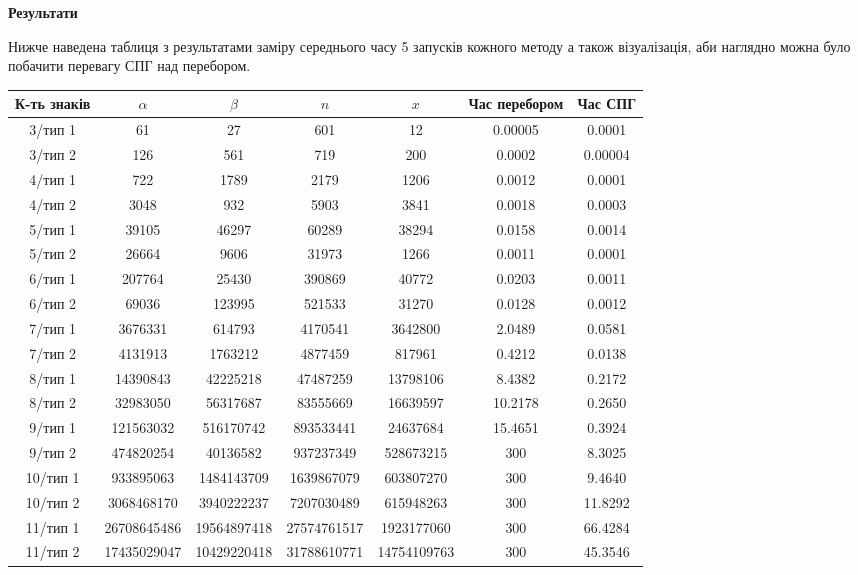 \documentclass[fontsize=14.4pt]{report}
\begin{document}
\noindent\large\textbf{Результати}\par
Нижче наведена таблиця з результатами заміру середнього часу 5 запусків кожного методу а також візуалізація, аби наглядно можна було побачити перевагу СПГ над перебором.
\begin{table}[h!]
\small
\centering
\begin{tabular}{|c|c|c|c|c|c|c|}
\hline
К-ть знаків & $\alpha$ & $\beta$ & $n$ & $x$ & Час перебором &  Час СПГ \\
\hline
3/тип 1 & 61 & 27 & 601 & 12 & 0.00005 & 0.0001 \\
\hline
3/тип 2 & 126 & 561 & 719 & 200 & 0.0002 & 0.00004 \\
\hline
4/тип 1 & 722 & 1789 & 2179 & 1206 & 0.0012 & 0.0001 \\
\hline
4/тип 2 & 3048 & 932 & 5903 & 3841 & 0.0018 & 0.0003 \\
\hline
5/тип 1 & 39105 & 46297 & 60289 & 38294 & 0.0158 & 0.0014 \\
\hline
5/тип 2 & 26664 & 9606 & 31973 & 1266 & 0.0011 & 0.0001 \\
\hline
6/тип 1 & 207764 & 25430 & 390869 & 40772 & 0.0203 & 0.0011 \\
\hline
6/тип 2 & 69036 & 123995 & 521533 & 31270 & 0.0128 & 0.0012 \\
\hline
7/тип 1 & 3676331 & 614793 & 4170541 & 3642800 & 2.0489 & 0.0581 \\
\hline
7/тип 2 & 4131913 & 1763212 & 4877459 & 817961 & 0.4212 & 0.0138 \\
\hline
8/тип 1 & 14390843 & 42225218 & 47487259 & 13798106 & 8.4382 & 0.2172 \\
\hline
8/тип 2 & 32983050 & 56317687 & 83555669 & 16639597 & 10.2178 & 0.2650 \\
\hline
9/тип 1 & 121563032 & 516170742 & 893533441 & 24637684 & 15.4651 & 0.3924 \\
\hline
9/тип 2 & 474820254 & 40136582 & 937237349 & 528673215 & 300 & 8.3025 \\
\hline
10/тип 1 & 933895063 & 1484143709 & 1639867079 & 603807270 & 300 & 9.4640 \\
\hline
10/тип 2 & 3068468170 & 3940222237 & 7207030489 & 615948263 & 300 & 11.8292 \\
\hline
11/тип 1 & 26708645486 & 19564897418 & 27574761517 & 1923177060 & 300 & 66.4284 \\
\hline
11/тип 2 & 17435029047 & 10429220418 & 31788610771 & 14754109763 & 300 & 45.3546 \\
\hline
\end{tabular}
\label{tab:results}
\end{table}
\end{document}

